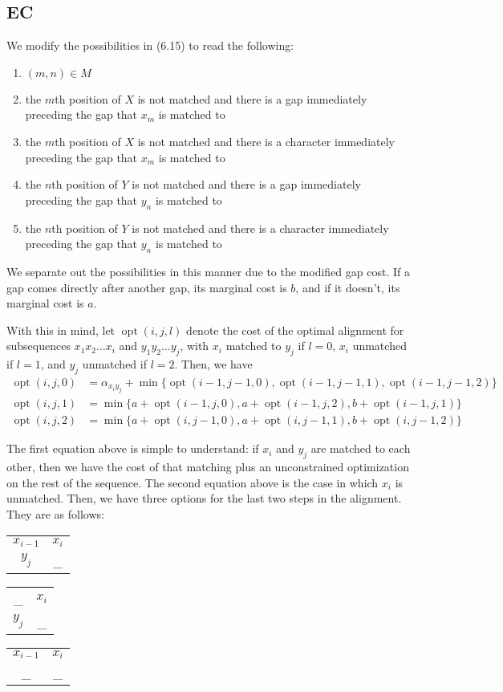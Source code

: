 \documentclass{article}
\DeclareMathOperator{\opt}{opt}
\begin{document}
\subsection*{EC}
We modify the possibilities in (6.15) to read the following:

\begin{enumerate}
\item $(m,n)\in M$
\item the $m$th position of $X$ is not matched and there is a gap immediately preceding the gap that $x_m$ is matched to
\item the $m$th position of $X$ is not matched and there is a character immediately preceding the gap that $x_m$ is matched to
\item the $n$th position of $Y$ is not matched and there is a gap immediately preceding the gap that $y_n$ is matched to
\item the $n$th position of $Y$ is not matched and there is a character immediately preceding the gap that $y_n$ is matched to
\end{enumerate}

We separate out the possibilities in this manner due to the modified gap cost. If a gap comes directly after another gap, its marginal cost is $b$, and if it doesn't, its marginal cost is $a$. 

With this in mind, let $\opt(i,j,l)$ denote the cost of the optimal alignment for subsequences $x_1x_2\ldots x_i$ and $y_1y_2\ldots y_j$, with $x_i$ matched to $y_j$ if $l=0$, $x_i$ unmatched if $l=1$, and $y_j$ unmatched if $l=2$. Then, we have 
\begin{align*}
\opt(i,j,0)&=\alpha_{x_iy_j}+\min\{\opt(i-1,j-1,0),\opt(i-1,j-1,1),\opt(i-1,j-1,2)\}\\
\opt(i,j,1)&=\min\{a+\opt(i-1,j,0),a+\opt(i-1,j,2),b+\opt(i-1,j,1)\}\\
\opt(i,j,2)&=\min\{a+\opt(i,j-1,0),a+\opt(i,j-1,1),b+\opt(i,j-1,2)\}
\end{align*}

The first equation above is simple to understand: if $x_i$ and $y_j$ are matched to each other, then we have the cost of that matching plus an unconstrained optimization on the rest of the sequence. The second equation above is the case in which $x_i$ is unmatched. Then, we have three options for the last two steps in the alignment. They are as follows:

\begin{tabular}{cc}
$x_{i-1}$ & $x_i$\\
$y_j$ & \_
\end{tabular}
\qquad
\begin{tabular}{cc}
\_ & $x_i$\\
$y_j$ & \_
\end{tabular}
\qquad
\begin{tabular}{cc}
$x_{i-1}$ & $x_i$\\
\_ & \_
\end{tabular}
\end{document}
